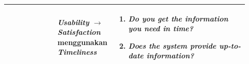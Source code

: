 \begin{longtable}{|p{0.2\linewidth}|p{0.2\linewidth}|p{0.53\linewidth}|}
                                                                  & \textbf{\textit{Usability} $\rightarrow$ \textit{Satisfaction}} menggunakan \textbf{\textit{Timeliness}}                                                & \begin{enumerate}[before=\vspace{-8pt}, leftmargin=*, nosep, series=ST] \item \textit{Do you get the information you need in time?} \item \textit{Does the system provide up-to-date information?} \end{enumerate}                                                                                                                                                                                                                                                                                                                                                                                                                                                                                                                                                                                                                                                                                                                                                                                                                                                                                                                                                                                                                                                                                                                                                                                                           \\
      \hline
\end{longtable}

\newpage

\label{annex:product-quality}

